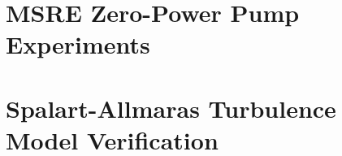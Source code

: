 


\section{MSRE Zero-Power Pump Experiments}



\section{Spalart-Allmaras Turbulence Model Verification}


